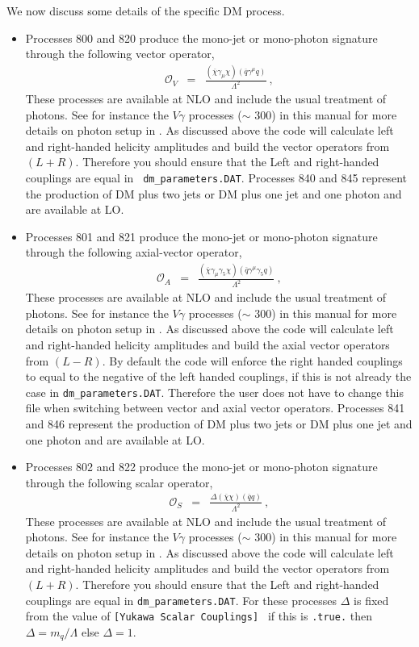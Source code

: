We now discuss some details of the specific DM process.

\begin{itemize}
\item 
Processes 800 and 820 produce the 
mono-jet or mono-photon signature through the following vector operator, 
\begin{eqnarray}
\mathcal{O}_V&=&\frac{(\overline{\chi}\gamma_{\mu}\chi)(\overline{q}\gamma^{\mu}q)}{\Lambda^2}~,\label{eq:OV}  
\end{eqnarray}
These processes are available at NLO and include the usual treatment of photons. See for instance the $V\gamma$ 
processes ($\sim$ 300) in this 
manual for more details on photon setup in \MCFM. As discussed above the code will calculate left and right-handed 
helicity amplitudes and build the 
vector operators from $(L+R)$. Therefore you should ensure that the Left and right-handed couplings are equal in  {\tt 
dm\_parameters.DAT}. 
Processes 840 and 845 represent the production of DM plus two jets or DM plus one jet and one photon and are available 
at LO. 
\item 
Processes 801 and 821 produce the 
mono-jet or mono-photon signature through the following axial-vector operator, 
\begin{eqnarray}
\mathcal{O}_A&=&\frac{(\overline{\chi}\gamma_{\mu}\gamma_5\chi)(\overline{q}\gamma^{\mu}\gamma_5q)}{\Lambda^2}~,\label{eq:OA}
\end{eqnarray}
These processes are available at NLO and include the usual treatment
of photons. See for instance the $V\gamma$ processes ($\sim$ 300) in
this manual for more details on photon setup in \MCFM. As discussed
above the code will calculate left and right-handed helicity
amplitudes and build the axial vector operators from $(L-R)$. By
default the code will enforce the right handed couplings to equal to
the negative of the left handed couplings, if this is not
already the case in {\tt dm\_parameters.DAT}. Therefore the user does
not have to change this file when switching between vector and axial
vector operators.  Processes 841 and 846 represent the production of
DM plus two jets or DM plus one jet and one photon and are available
at LO.
\item 
Processes 802 and 822 produce the 
mono-jet or mono-photon signature through the following scalar operator, 
\begin{eqnarray}
\mathcal{O}_S&=&\frac{\Delta(\overline{\chi}\chi)(\overline{q}q)}{\Lambda^2}~,
\end{eqnarray}
These processes are available at NLO and include the usual treatment
of photons. See for instance the $V\gamma$ processes ($\sim$ 300) in
this manual for more details on photon setup in \MCFM. As discussed
above the code will calculate left and right-handed helicity
amplitudes and build the vector operators from $(L+R)$. Therefore you
should ensure that the Left and right-handed couplings are equal in
{\tt dm\_parameters.DAT}. For these processes $\Delta$ is fixed from
the value of {\tt [Yukawa Scalar Couplings] } if this is {\tt .true.}
then $\Delta=m_q/\Lambda$ else $\Delta=1$.


\end{itemize}
